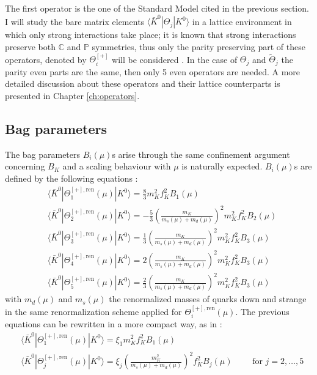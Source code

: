 \documentclass[english, LaM, oneside, noexaminfo]{sapthesis}
\newcommand{\la}{\langle}
\newcommand{\ra}{\rangle}
\newcommand{\ren}{{\text{ren}}}
\begin{document}
The first operator is the one of the Standard Model cited in the previous section.
I will study the bare matrix elements $\la \bar K^0 | \Theta_j | K^0 \ra$ in a lattice environment in which only strong interactions take place; it is known that strong interactions preserve both $\mathbb{C}$ and $\mathbb{P}$ symmetries, thus only the parity preserving part of these operators, denoted by $\Theta_i^{[+]}$ will be considered \cite{KMBSM}.
In the case of $\Theta_j$ and $\tilde\Theta_j$ the parity even parts are the same, then only 5 even operators are needed.
A more detailed discussion about these operators and their lattice counterparts is presented in Chapter \ref{ch:operators}.

\subsection{Bag parameters}
\noindent
The bag parameters $B_i(\mu)$s arise through the same confinement argument concerning $B_K$ and a scaling behaviour with $\mu$ is naturally expected.
$B_i(\mu)$s are defined by the following equations \cite{Bparameters}:
\begin{equation*}
    \begin{aligned}
        & \la \bar K^0 | \Theta_1^{[+],\ren}(\mu) | K^0 \ra = \frac{8}{3} m_K^2 f_K^2 B_1(\mu) \\
        & \la \bar K^0 | \Theta_2^{[+],\ren}(\mu) | K^0 \ra = -\frac{5}{3} \left(\frac{m_K}{m_s(\mu)+m_d(\mu)}\right)^2 m_K^2 f_K^2 B_2(\mu) \\
        & \la \bar K^0 | \Theta_3^{[+],\ren}(\mu) | K^0 \ra = \frac{1}{3} \left(\frac{m_K}{m_s(\mu)+m_d(\mu)}\right)^2 m_K^2 f_K^2 B_3(\mu) \\
        & \la \bar K^0 | \Theta_4^{[+],\ren}(\mu) | K^0 \ra = 2 \left(\frac{m_K}{m_s(\mu)+m_d(\mu)}\right)^2 m_K^2 f_K^2 B_3(\mu) \\
        & \la \bar K^0 | \Theta_5^{[+],\ren}(\mu) | K^0 \ra = \frac{2}{3} \left(\frac{m_K}{m_s(\mu)+m_d(\mu)}\right)^2 m_K^2 f_K^2 B_3(\mu)
    \end{aligned}
\end{equation*}
with $m_d (\mu)$ and $m_s (\mu)$ the renormalized masses of quarks down and strange in the same renormalization scheme applied for $\Theta_i^{[+],\ren}(\mu)$.
The previous equations can be rewritten in a more compact way, as in \cite{KMBSM}:
\begin{equation}\label{eq:bag-definition}
    \begin{aligned}
        & \la \bar K^0 | \Theta_1^{[+],\ren}(\mu) | K^0 \ra = \xi_1 m_K^2 f_K^2 B_1(\mu) \\
        & \la \bar K^0 | \Theta_j^{[+],\ren}(\mu) | K^0 \ra = \xi_j \left(\frac{m_K^2}{m_s(\mu)+m_d(\mu)}\right)^2 f_K^2 B_j(\mu) \quad \quad \text{ for } j=2,\dots,5
    \end{aligned}
\end{equation}
\end{document}
